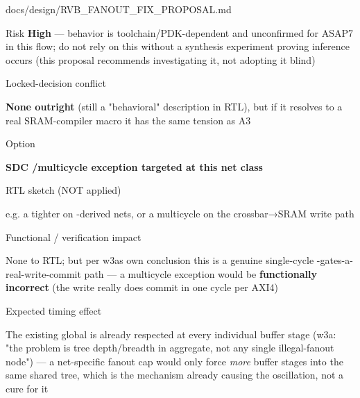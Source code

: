 \begin{relocated}{docs/design/RVB_FANOUT_FIX_PROPOSAL.md}
\begin{rowtable}
\begin{rowcell}{Risk}
\textbf{High} --- behavior is toolchain/\allowbreak{}PDK-dependent and
unconfirmed for ASAP7 in this flow; do not rely on this without a
synthesis experiment proving inference occurs (this proposal recommends
investigating it, not adopting it blind)

\end{rowcell}

\begin{rowcell}{Locked-decision conflict}

\textbf{None outright} (still a "behavioral" description in RTL), but if
it resolves to a real SRAM-compiler macro it has the same tension as A3

\end{rowcell}


\begin{rowcell}{Option}

\textbf{SDC /\allowbreak{}multicycle exception
targeted at this net class}

\end{rowcell}

\begin{rowcell}{RTL sketch (NOT applied)}

e.g. a tighter  on -derived nets, or
a multicycle on the crossbar→SRAM write path

\end{rowcell}

\begin{rowcell}{Functional / verification impact}

None to RTL; but per w3a\textquotesingle s own conclusion this is a
genuine single-cycle -gates-a-real-write-commit path ---
a multicycle exception would be \textbf{functionally incorrect} (the
write really does commit in one cycle per AXI4)

\end{rowcell}

\begin{rowcell}{Expected timing effect}

The existing global  is already respected
at every individual buffer stage (w3a: "the problem is tree
depth/\allowbreak{}breadth in aggregate, not any single illegal-fanout
node") --- a net-specific fanout cap would only force \emph{more} buffer
stages into the same shared tree, which is the mechanism already causing
the oscillation, not a cure for it


\end{rowcell}
\end{rowtable}
\end{relocated}
